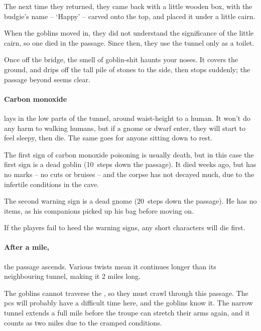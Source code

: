 \begin{multicols}{2}
\begin{exampletext}
  The next time they returned, they came back with a little wooden box, with the budgie's name -- `Happy' -- carved onto the top, and placed it under a little cairn.

  When the goblins moved in, they did not understand the significance of the little cairn, so one died in the passage.
  Since then, they use the tunnel only as a toilet.
\end{exampletext}

\begin{boxtext}
  Once off the bridge, the smell of goblin-shit haunts your noses.
  It covers the ground, and drips off the tall pile of stones to the side, then stops suddenly; the passage beyond seems clear.
\end{boxtext}

\paragraph{Carbon monoxide}
lays in the low parts of the tunnel, around waist-height to a human.
It won't do any harm to walking humans, but if a gnome or dwarf enter, they will start to feel sleepy, then die.
The same goes for anyone sitting down to rest.

The first sign of carbon monoxide poisoning is usually death, but in this case the first sign is a dead goblin (10~\glspl{step} down the passage).
It died weeks ago, but has no marks -- no cuts or bruises -- and the corpse has not decayed much, due to the infertile conditions in the cave.

The second warning sign is a dead gnome (20~\glspl{step} down the passage).
He has no items, as his companions picked up his bag before moving on.

If the players fail to heed the warning signs, any short characters will die first.

\paragraph{After a mile,}
the passage ascends.
Various twists mean it continues longer than its neighbouring tunnel, making it 2 miles long.


The goblins cannot traverse the , so they must crawl through this passage.
The \glspl{pc} will probably have a difficult time here, and the goblins know it.
The narrow tunnel extends a full mile before the troupe can stretch their arms again, and it counts as two miles due to the cramped conditions.


\end{multicols}
